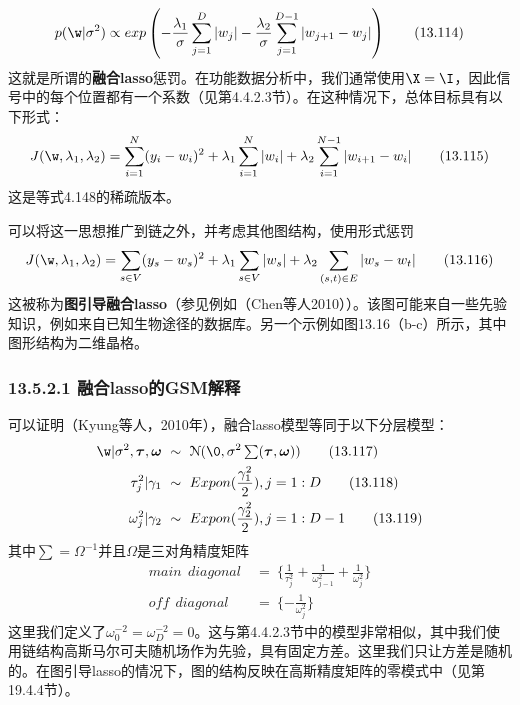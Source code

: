 \documentclass[a4paper]{article}
\begin{document}
\begin{equation}
	p(\w|\sigma^2)\propto exp\left(-\frac{\lambda_1}{\sigma}\sum_{j=1}^{D}|w_j|-\frac{\lambda_2}{\sigma}\sum_{j=1}^{D-1}|w_{j+1}-w_j|\right)\tag{13.114}
\end{equation}
这就是所谓的\textbf{融合lasso}惩罚。在功能数据分析中，我们通常使用$\X=\I$，因此信号中的每个位置都有一个系数（见第4.4.2.3节）。在这种情况下，总体目标具有以下形式：
\begin{equation}
	J(\w,\lambda_1,\lambda_2)=\sum_{i=1}^{N}(y_i-w_i)^2+\lambda_1\sum_{i=1}^{N}|w_i|+\lambda_2\sum_{i=1}^{N-1}|w_{i+1}-w_i|\tag{13.115}
\end{equation}
这是等式4.148的稀疏版本。

可以将这一思想推广到链之外，并考虑其他图结构，使用形式惩罚
\begin{equation}
	J(\w,\lambda_1,\lambda_2)=\sum_{s\in V}(y_s-w_s)^2+\lambda_1\sum_{s\in V}|w_s|+\lambda_2\sum_{(s,t)\in E}|w_{s}-w_t|\tag{13.116}
\end{equation}
这被称为\textbf{图引导融合lasso}（参见例如（Chen等人2010））。该图可能来自一些先验知识，例如来自已知生物途径的数据库。另一个示例如图13.16（b-c）所示，其中图形结构为二维晶格。

\subsubsection*{13.5.2.1 融合lasso的GSM解释}
可以证明（Kyung等人，2010年），融合lasso模型等同于以下分层模型：
\begin{align}
	\w|\sigma^2,\boldsymbol{\tau},\boldsymbol{\omega} \ &\sim\ \mathcal{N}(\0,\sigma^2\textstyle\sum(\boldsymbol{\tau},\boldsymbol{\omega}))\tag{13.117}\\
	\tau_j^2|\gamma_1\ &\sim\ Expon(\frac{\gamma_1^2}{2}),j=1:D\tag{13.118}\\
	\omega_j^2|\gamma_2\ &\sim\ Expon(\frac{\gamma_2^2}{2}),j=1:D-1\tag{13.119}
\end{align}
其中$\sum=\Omega^{-1}$并且$\Omega$是三对角精度矩阵
\begin{align}
	main \ \ diagonal\ &=\ \{\frac{1}{\tau_j^2}+\frac{1}{\omega_{j-1}^2}+\frac{1}{\omega_j^2}\}\tag{13.120}\\
	off\ \  diagonal\ &=\ \{-\frac{1}{\omega_j^2}\}\tag{13.121}
\end{align}
这里我们定义了$\omega_0^{-2}=\omega_D^{-2}=0$。这与第4.4.2.3节中的模型非常相似，其中我们使用链结构高斯马尔可夫随机场作为先验，具有固定方差。这里我们只让方差是随机的。在图引导lasso的情况下，图的结构反映在高斯精度矩阵的零模式中（见第19.4.4节）。
\end{document}
